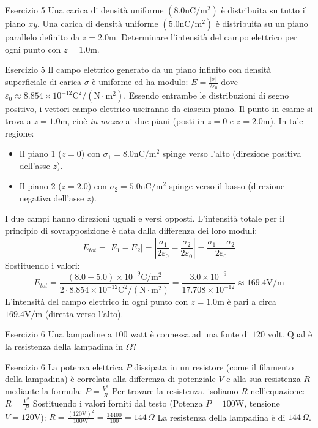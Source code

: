 \documentclass[a4paper]{article}
\begin{document}
\begin{snippetexercise}{Esercizio 5}
    Una carica di densità uniforme \((8.0 \mathrm{nC/m^2})\)
    è distribuita su tutto il piano \(xy\).
    Una carica di densità uniforme \((5.0 \mathrm{nC/m^2})\)
    è distribuita su un piano parallelo definito da \(z = 2.0 \mathrm{m}\).
    Determinare l'intensità del campo elettrico per ogni punto
    con \(z = 1.0 \mathrm{m}\).
\end{snippetexercise}
\begin{snippetsolution}{Esercizio 5}
    Il campo elettrico generato da un piano infinito con densità superficiale di carica \(\sigma\) è uniforme ed ha modulo:
    \(E = \frac{|\sigma|}{2\varepsilon_0}\)
    dove \(\varepsilon_0 \approx 8.854 \times 10^{-12} \mathrm{C^2/(N \cdot m^2)}\). Essendo entrambe le distribuzioni di segno positivo, i vettori campo elettrico usciranno da ciascun piano.
    Il punto in esame si trova a \(z = 1.0 \mathrm{m}\), cioè \textit{in mezzo} ai due piani (posti in \(z = 0\) e \(z = 2.0 \mathrm{m}\)).
    In tale regione:
    \begin{itemize}[nosep]
        \item Il piano 1 (\(z = 0\)) con \(\sigma_1 = 8.0 \mathrm{nC/m^2}\) spinge verso l'alto (direzione positiva dell'asse \(z\)).
        \item Il piano 2 (\(z = 2.0\)) con \(\sigma_2 = 5.0 \mathrm{nC/m^2}\) spinge verso il basso (direzione negativa dell'asse \(z\)).
    \end{itemize}
    I due campi hanno direzioni uguali e versi opposti. L'intensità totale per il principio di sovrapposizione è data dalla differenza dei loro moduli:
    \[ E_{tot} = |E_1 - E_2| = \left| \frac{\sigma_1}{2\varepsilon_0} - \frac{\sigma_2}{2\varepsilon_0} \right| = \frac{\sigma_1 - \sigma_2}{2\varepsilon_0} \]
    Sostituendo i valori:
    \[ E_{tot} = \frac{(8.0 - 5.0) \times 10^{-9} \mathrm{C/m^2}}{2 \cdot 8.854 \times 10^{-12} \mathrm{C^2/(N \cdot m^2)}} = \frac{3.0 \times 10^{-9}}{17.708 \times 10^{-12}} \approx 169.4 \mathrm{V/m} \]
    L'intensità del campo elettrico in ogni punto con \(z = 1.0 \mathrm{m}\) è pari a circa \(169.4 \mathrm{V/m}\) (diretta verso l'alto).
\end{snippetsolution}
\begin{snippetexercise}{Esercizio 6}
    Una lampadine a \(100\) watt è connessa ad una fonte di \(120\) volt.
    Qual è la resistenza della lampadina in \(\Omega\)?
\end{snippetexercise}
\begin{snippetsolution}{Esercizio 6}
    La potenza elettrica \(P\) dissipata in un resistore (come il filamento della lampadina) è correlata alla differenza di potenziale \(V\) e alla sua resistenza \(R\) mediante la formula:
    \(P = \frac{V^2}{R}\)
    Per trovare la resistenza, isoliamo \(R\) nell'equazione:
    \(R = \frac{V^2}{P}\)
    Sostituendo i valori forniti dal testo (Potenza \(P = 100 \mathrm{W}\), tensione \(V = 120 \mathrm{V}\)):
    \(R = \frac{(120 \mathrm{V})^2}{100 \mathrm{W}} = \frac{14400}{100} = 144 \, \Omega\)
    La resistenza della lampadina è di \(144 \, \Omega\).
\end{snippetsolution}
\end{document}
